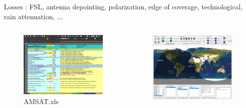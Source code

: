 \documentclass{beamer}
\begin{document}
\begin{frame}
	Losses : FSL, antenna depointing, polarization, edge of coverage, technological, rain attenuation, ... %
	\pause
	\begin{columns}[onlytextwidth]
		\begin{column}{.32\textwidth}
			\begin{figure}
				\includegraphics[width=\textwidth]{AMSAT.png}
				\caption{AMSAT.xls}
			\end{figure}
		\end{column}
		\hfill
		\begin{column}{.32\textwidth}
			\begin{figure}
				\includegraphics[width=\textwidth]{satorb.png}

\end{figure}
\end{column}
\end{columns}
\end{frame}
\end{document}
